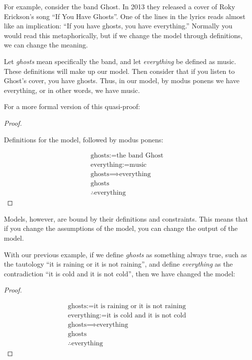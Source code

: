 \documentclass[
  letterpaper,
  DIV=11,
  numbers=noendperiod]{scrreprt}
\theoremstyle{remark}
\begin{document}
For example, consider the band Ghost. In 2013 they released a cover of
Roky Erickson's song ``If You Have Ghosts''. One of the lines in the
lyrics reads almost like an implication: ``If you have ghosts, you have
everything.'' Normally you would read this metaphorically, but if we
change the model through definitions, we can change the meaning.

Let \emph{ghosts} mean specifically the band, and let \emph{everything}
be defined as music. These definitions will make up our model. Then
consider that if you listen to Ghost's cover, you have ghosts. Thus, in
our model, by modus ponens we have everything, or in other words, we
have music.

For a more formal version of this quasi-proof:

\begin{proof}
~

Definitions for the model, followed by modus ponens:

\[
\begin{array}{l}
\text{ghosts} := \text{the band Ghost} \\
\text{everything} := \text{music} \\[1em]
\text{ghosts} \implies \text{everything} \\
\text{ghosts} \\
\hline
\therefore \text{everything}
\end{array}
\]
\end{proof}

Models, however, are bound by their definitions and constraints. This
means that if you change the assumptions of the model, you can change
the output of the model.

With our previous example, if we define \emph{ghosts} as something
always true, such as the tautology ``it is raining or it is not
raining'', and define \emph{everything} as the contradiction ``it is
cold and it is not cold'', then we have changed the model:

\begin{proof}
~

\[
\begin{array}{l}
\text{ghosts} := \text{it is raining or it is not raining} \\
\text{everything} := \text{it is cold and it is not cold} \\[1em]
\text{ghosts} \implies \text{everything} \\
\text{ghosts} \\
\hline
\therefore \text{everything}
\end{array}
\]
\end{proof}
\end{document}
